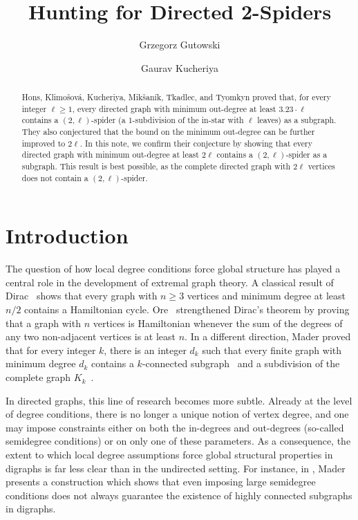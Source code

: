 \documentclass[a4paper,USenglish,cleveref,autoref,thm-restate,pdfa]{lipics-v2021}
\title{Hunting for Directed 2-Spiders}
\author{Grzegorz Gutowski}
  {Institute of Theoretical Computer Science, Faculty of Mathematics and Computer Science, Jagiellonian University, Krak{\'o}w, Poland}
  {grzegorz.gutowski@uj.edu.pl}
  {https://orcid.org/0000-0003-3313-1237}
  {Partially supported by grant no.~2023/49/B/ST6/01738 from National Science Centre, Poland.}
\author{Gaurav Kucheriya}
  {Department of Applied Mathematics, Charles University, Prague, Czechia}
  {gaurav@kam.mff.cuni.cz}
  {https://orcid.org/0000-0002-5254-5198}
  {Partially supported by GA\v{C}R grant 25-17377S and GAUK project 92125.}
\let\ge\geqslant
\begin{document}
\maketitle

\begin{abstract}
    Hons, Klimošová, Kucheriya, Mikšaník, Tkadlec, and Tyomkyn proved that, for every integer $\ell \ge 1$, every directed graph with minimum out-degree at least $3.23 \cdot \ell$ contains a $(2,\ell)$\nobreakdash-spider (a $1$\nobreakdash-subdivision of the in-star with $\ell$ leaves) as a subgraph.
    They also conjectured that the bound on the minimum out-degree can be further improved to $2 \ell$.
    In this note, we confirm their conjecture by showing that
    every directed graph with minimum out-degree at least $2\ell$ contains a $(2, \ell)$\nobreakdash-spider as a subgraph.
    This result is best possible, as the complete directed graph with $2\ell$ vertices does not contain a $(2,\ell)$\nobreakdash-spider.
\end{abstract}

\section{Introduction}

The question of how local degree conditions force global structure has played a central role in the development of extremal graph theory.
A classical result of Dirac~\cite{Dirac1952} shows that every graph with $n \ge 3$ vertices and minimum degree at least $n/2$ contains a Hamiltonian cycle.
Ore~\cite{Ore1960} strengthened Dirac’s theorem by proving that a graph with $n$ vertices is Hamiltonian whenever the sum of the degrees of any two non-adjacent vertices is at least $n$.
In a different direction, Mader proved that for every integer $k$, there is an integer $d_k$ such that every finite graph with minimum degree $d_k$ contains a $k$-connected subgraph~\cite{Mader1972a} and a subdivision of the complete graph $K_k$~\cite{Mader1972b}.

In directed graphs, this line of research becomes more subtle.
Already at the level of degree conditions, there is no longer a unique notion of vertex degree, and one may impose constraints either on both the in-degrees and out-degrees (so-called semidegree conditions) or on only one of these parameters.
As a consequence, the extent to which local degree assumptions force global structural properties in digraphs is far less clear than in the undirected setting.
For instance, in \cite{Mader1985}, Mader presents a construction which shows that even imposing large semidegree conditions does not always guarantee the existence of highly connected subgraphs in digraphs.
\end{document}
